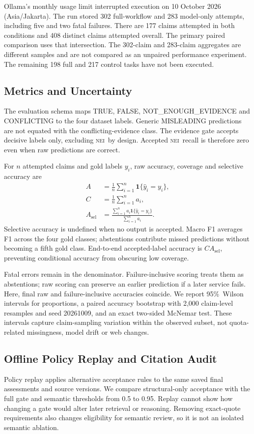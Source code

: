\documentclass[conference]{IEEEtran}
\newcommand{\NEI}{\textsc{nei}}
\newcommand{\pct}{\%}
\begin{document}
Ollama's monthly usage limit interrupted execution on 10 October 2026 (Asia/Jakarta). The run stored 302 full-workflow and 283 model-only attempts, including five and two fatal failures. There are 177 claims attempted in both conditions and 408 distinct claims attempted overall. The primary paired comparison uses that intersection. The 302-claim and 283-claim aggregates are different samples and are not compared as an unpaired performance experiment. The remaining 198 full and 217 control tasks have not been executed.

\subsection{Metrics and Uncertainty}
The evaluation schema maps TRUE, FALSE, NOT\_ENOUGH\_EVIDENCE and CONFLICTING to the four dataset labels. Generic MISLEADING predictions are not equated with the conflicting-evidence class. The evidence gate accepts decisive labels only, excluding \NEI\ by design. Accepted \NEI\ recall is therefore zero even when raw predictions are correct.

For $n$ attempted claims and gold labels $y_i$, raw accuracy, coverage and selective accuracy are
\begin{align}
A &= \frac{1}{n}\sum_{i=1}^{n}\mathbf{1}\{\hat y_i=y_i\},\\
C &= \frac{1}{n}\sum_{i=1}^{n}a_i,\\
A_{\mathrm{sel}} &=
\frac{\sum_{i=1}^{n}a_i\mathbf{1}\{\hat y_i=y_i\}}
{\sum_{i=1}^{n}a_i}.
\end{align}
Selective accuracy is undefined when no output is accepted. Macro F1 averages F1 across the four gold classes; abstentions contribute missed predictions without becoming a fifth gold class. End-to-end accepted-label accuracy is $C A_{\mathrm{sel}}$, preventing conditional accuracy from obscuring low coverage.

Fatal errors remain in the denominator. Failure-inclusive scoring treats them as abstentions; raw scoring can preserve an earlier prediction if a later service fails. Here, final raw and failure-inclusive accuracies coincide. We report 95\pct\ Wilson intervals for proportions, a paired accuracy bootstrap with 2,000 claim-level resamples and seed 20261009, and an exact two-sided McNemar test. These intervals capture claim-sampling variation within the observed subset, not quota-related missingness, model drift or web changes.

\subsection{Offline Policy Replay and Citation Audit}
Policy replay applies alternative acceptance rules to the same saved final assessments and source versions. We compare structural-only acceptance with the full gate and semantic thresholds from 0.5 to 0.95. Replay cannot show how changing a gate would alter later retrieval or reasoning. Removing exact-quote requirements also changes eligibility for semantic review, so it is not an isolated semantic ablation.
\end{document}
